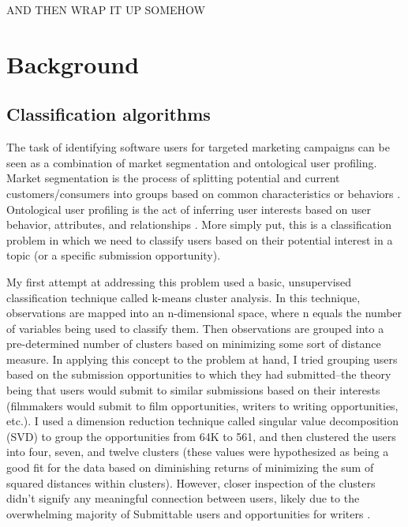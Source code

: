 \documentclass[]{report}   %
\begin{document}
AND THEN WRAP IT UP SOMEHOW

\chapter{Background}
\section{Classification algorithms}

The task of identifying software users for targeted marketing campaigns can be seen as a combination of market segmentation and ontological user profiling. Market segmentation is the process of splitting potential and current customers/consumers into groups based on common characteristics or behaviors \cite{johnson_1971}. Ontological user profiling is the act of inferring user interests based on user behavior, attributes, and relationships \cite{middleton_shadbolt_roure_2004}. More simply put, this is a classification problem in which we need to classify users based on their potential interest in a topic (or a specific submission opportunity). 

My first attempt at addressing this problem used a basic, unsupervised classification technique called k-means cluster analysis. In this technique, observations are mapped into an n-dimensional space, where n equals the number of variables being used to classify them. Then observations are grouped into a pre-determined number of clusters based on minimizing some sort of distance measure\cite{jain_2010}. In applying this concept to the problem at hand, I tried grouping users based on the submission opportunities to which they had submitted--the theory being that users would submit to similar submissions based on their interests (filmmakers would submit to film opportunities, writers to writing opportunities, etc.). I used a dimension reduction technique called singular value decomposition (SVD) to group the opportunities from 64K to 561, and then clustered the users into four, seven, and twelve clusters (these values were hypothesized as being a good fit for the data based on diminishing returns of minimizing the sum of squared distances within clusters). However, closer inspection of the clusters didn't signify any meaningful connection between users, likely due to the overwhelming majority of Submittable users and opportunities for writers \cite{marbut_2018}.
\end{document}
